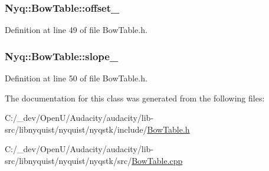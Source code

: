 \subsubsection[{\texorpdfstring{offset\+\_\+}{offset_}}]{ Nyq\+::\+Bow\+Table\+::offset\+\_\+\hspace{0.3cm}{\ttfamily [protected]}}\hypertarget{class_nyq_1_1_bow_table_acefb482ac919244afc8fbd8795dec088}{}\label{class_nyq_1_1_bow_table_acefb482ac919244afc8fbd8795dec088}


Definition at line 49 of file Bow\+Table.\+h.

\subsubsection[{\texorpdfstring{slope\+\_\+}{slope_}}]{ Nyq\+::\+Bow\+Table\+::slope\+\_\+\hspace{0.3cm}{\ttfamily [protected]}}\hypertarget{class_nyq_1_1_bow_table_a7ccd566fd4bfd79f2d0d15c561c9e9fd}{}\label{class_nyq_1_1_bow_table_a7ccd566fd4bfd79f2d0d15c561c9e9fd}


Definition at line 50 of file Bow\+Table.\+h.



The documentation for this class was generated from the following files\+:\begin{DoxyCompactItemize}
\item 
C\+:/\+\_\+dev/\+Open\+U/\+Audacity/audacity/lib-\/src/libnyquist/nyquist/nyqstk/include/\hyperlink{_bow_table_8h}{Bow\+Table.\+h}\item 
C\+:/\+\_\+dev/\+Open\+U/\+Audacity/audacity/lib-\/src/libnyquist/nyquist/nyqstk/src/\hyperlink{_bow_table_8cpp}{Bow\+Table.\+cpp}\end{DoxyCompactItemize}
